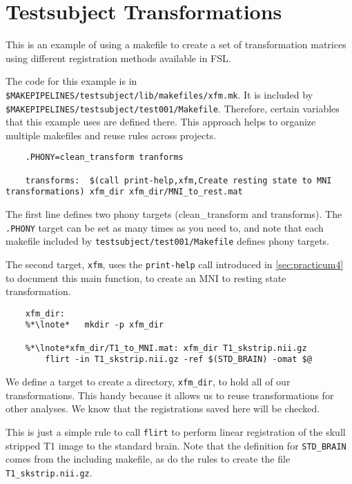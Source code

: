 \section{Testsubject Transformations}
\label{example:testsubjectxfm}

This is an example of using a makefile to create a set of transformation matrices using different registration methods available in FSL. 

The code for this example is in \texttt{\$MAKEPIPELINES/testsubject/lib/makefiles/xfm.mk}. It is included by \texttt{\$MAKEPIPELINES/testsubject/test001/Makefile}. Therefore, certain variables that this example uses are defined there. This approach helps to organize multiple makefiles and reuse rules across projects.

\setcounter{codehighlight}{0} %
\begin{lstlisting}
	.PHONY=clean_transform tranforms 

	transforms:  $(call print-help,xfm,Create resting state to MNI transformations) xfm_dir xfm_dir/MNI_to_rest.mat
\end{lstlisting}

The first line defines two phony targets (clean\_transform and transforms). The \texttt{.PHONY} target can be set as many times as you need to, and note that each makefile included by \texttt{testsubject/test001/Makefile} defines phony targets. 

The second target, \texttt{xfm}, uses the \texttt{print-help} call introduced in \autoref{sec:practicum4} to document this main function, to create an MNI to resting state transformation.

\begin{lstlisting}
	xfm_dir:
	%*\lnote*	mkdir -p xfm_dir

	%*\lnote*xfm_dir/T1_to_MNI.mat: xfm_dir T1_skstrip.nii.gz 
		flirt -in T1_skstrip.nii.gz -ref $(STD_BRAIN) -omat $@
\end{lstlisting}

 We define a target to create a directory, \texttt{xfm_dir},
to hold all of our transformations. This handy because it allows us to
reuse transformations for other analyses. We know that
the registrations saved here will be checked. 

 This is just a simple rule to call \texttt{flirt} to perform
linear registration of the skull stripped T1 image to the standard
brain. Note that the definition for \texttt{STD_BRAIN} comes from the
including makefile, as do the rules to create the file \texttt{T1_skstrip.nii.gz}.


